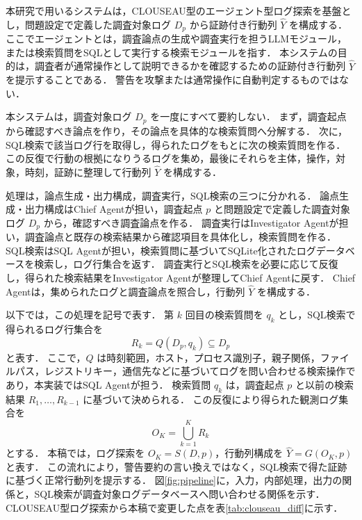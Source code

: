 \documentclass[a4paper,twocolumn,10pt]{article}
\begin{document}
本研究で用いるシステムは，CLOUSEAU型のエージェント型ログ探索\cite{clouseau}を基盤とし，問題設定で定義した調査対象ログ \(D_p\) から証跡付き行動列 \(\hat{Y}\) を構成する．
ここでエージェントとは，調査論点の生成や調査実行を担うLLMモジュール，または検索質問をSQLとして実行する検索モジュールを指す．
本システムの目的は，調査者が通常操作として説明できるかを確認するための証跡付き行動列 \(\hat{Y}\) を提示することである．
警告を攻撃または通常操作に自動判定するものではない．

本システムは，調査対象ログ \(D_p\) を一度にすべて要約しない．
まず，調査起点から確認すべき論点を作り，その論点を具体的な検索質問へ分解する．
次に，SQL検索で該当ログ行を取得し，得られたログをもとに次の検索質問を作る．
この反復で行動の根拠になりうるログを集め，最後にそれらを主体，操作，対象，時刻，証跡に整理して行動列 \(\hat{Y}\) を構成する．

処理は，論点生成・出力構成，調査実行，SQL検索の三つに分かれる．
論点生成・出力構成はChief Agentが担い，調査起点 \(p\) と問題設定で定義した調査対象ログ \(D_p\) から，確認すべき調査論点を作る．
調査実行はInvestigator Agentが担い，調査論点と既存の検索結果から確認項目を具体化し，検索質問を作る．
SQL検索はSQL Agentが担い，検索質問に基づいてSQLite化されたログデータベースを検索し，ログ行集合を返す．
調査実行とSQL検索を必要に応じて反復し，得られた検索結果をInvestigator Agentが整理してChief Agentに戻す．
Chief Agentは，集められたログと調査論点を照合し，行動列 \(\hat{Y}\) を構成する．

以下では，この処理を記号で表す．
第 \(k\) 回目の検索質問を \(q_k\) とし，SQL検索で得られるログ行集合を
\[
R_k=Q(D_p,q_k)\subseteq D_p
\]
と表す．
ここで，\(Q\) は時刻範囲，ホスト，プロセス識別子，親子関係，ファイルパス，レジストリキー，通信先などに基づいてログを問い合わせる検索操作であり，本実装ではSQL Agentが担う．
検索質問 \(q_k\) は，調査起点 \(p\) と以前の検索結果 \(R_1,\ldots,R_{k-1}\) に基づいて決められる．
この反復により得られた観測ログ集合を
\[
O_K=\bigcup_{k=1}^{K}R_k
\]
とする．
本稿では，ログ探索を \(O_K=S(D,p)\)，行動列構成を \(\hat{Y}=G(O_K,p)\) と表す．
この流れにより，警告要約の言い換えではなく，SQL検索で得た証跡に基づく正常行動列を提示する．
図\ref{fig:pipeline}に，入力，内部処理，出力の関係と，SQL検索が調査対象ログデータベースへ問い合わせる関係を示す．
CLOUSEAU型ログ探索から本稿で変更した点を表\ref{tab:clouseau_diff}に示す．
\end{document}
